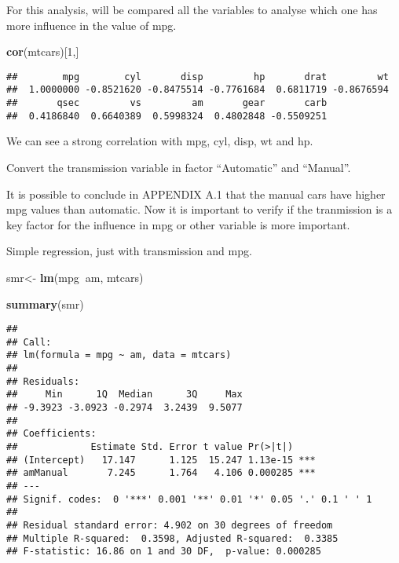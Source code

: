 \documentclass[]{article}
\newenvironment{Shaded}{\begin{snugshade}}{\end{snugshade}}
\newcommand{\DataTypeTok}[1]{\textcolor[rgb]{0.13,0.29,0.53}{#1}}
\newcommand{\DecValTok}[1]{\textcolor[rgb]{0.00,0.00,0.81}{#1}}
\newcommand{\KeywordTok}[1]{\textcolor[rgb]{0.13,0.29,0.53}{\textbf{#1}}}
\newcommand{\NormalTok}[1]{#1}
\newcommand{\OperatorTok}[1]{\textcolor[rgb]{0.81,0.36,0.00}{\textbf{#1}}}
\newcommand{\StringTok}[1]{\textcolor[rgb]{0.31,0.60,0.02}{#1}}
\begin{document}
For this analysis, will be compared all the variables to analyse which
one has more influence in the value of mpg.

\begin{Shaded}
\begin{Highlighting}[]
\KeywordTok{cor}\NormalTok{(mtcars)[}\DecValTok{1}\NormalTok{,]}
\end{Highlighting}
\end{Shaded}

\begin{verbatim}
##        mpg        cyl       disp         hp       drat         wt 
##  1.0000000 -0.8521620 -0.8475514 -0.7761684  0.6811719 -0.8676594 
##       qsec         vs         am       gear       carb 
##  0.4186840  0.6640389  0.5998324  0.4802848 -0.5509251
\end{verbatim}

We can see a strong correlation with mpg, cyl, disp, wt and hp.

Convert the transmission variable in factor ``Automatic'' and
``Manual''.

\begin{Shaded}
\end{Shaded}

It is possible to conclude in APPENDIX A.1 that the manual cars have
higher mpg values than automatic. Now it is important to verify if the
tranmission is a key factor for the influence in mpg or other variable
is more important.

Simple regression, just with transmission and mpg.

\begin{Shaded}
\begin{Highlighting}[]
\NormalTok{smr<-}\StringTok{ }\KeywordTok{lm}\NormalTok{(mpg}\OperatorTok{~}\NormalTok{am, mtcars)}

\KeywordTok{summary}\NormalTok{(smr)}
\end{Highlighting}
\end{Shaded}

\begin{verbatim}
## 
## Call:
## lm(formula = mpg ~ am, data = mtcars)
## 
## Residuals:
##     Min      1Q  Median      3Q     Max 
## -9.3923 -3.0923 -0.2974  3.2439  9.5077 
## 
## Coefficients:
##             Estimate Std. Error t value Pr(>|t|)    
## (Intercept)   17.147      1.125  15.247 1.13e-15 ***
## amManual       7.245      1.764   4.106 0.000285 ***
## ---
## Signif. codes:  0 '***' 0.001 '**' 0.01 '*' 0.05 '.' 0.1 ' ' 1
## 
## Residual standard error: 4.902 on 30 degrees of freedom
## Multiple R-squared:  0.3598, Adjusted R-squared:  0.3385 
## F-statistic: 16.86 on 1 and 30 DF,  p-value: 0.000285
\end{verbatim}
\end{document}

